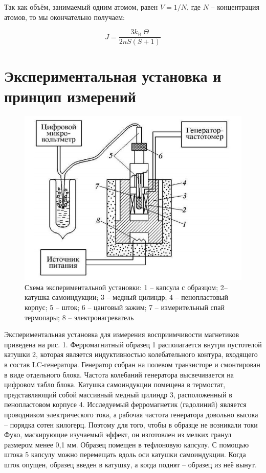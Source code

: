 \documentclass[a4paper, 12pt]{article}%
\begin{document}
Так как объём, занимаемый одним атомом, равен $V=1/N$, где $N$ -- концентрация атомов, то мы окончательно получаем:

$$
J=\frac{3 k_{\text {B }} \Theta}{2 n S(S+1)}
$$
\newpage
\section{Экспериментальная установка и принцип измерений}

\begin{figure}[h!]
\begin{center}
\includegraphics[scale=0.7]{1.jpg}
\caption{Схема экспериментальной установки: 1 -- капсула с образцом; 2-- катушка самоиндукции; 3 -- медный цилиндр; 4 -- пенопластовый корпус; 5 -- шток; 6 -- цанговый зажим; 7 -- измерительный спай термопары; 8 -- электронагреватель}
\end{center}
\end{figure}

Экспериментальная установка для измерения восприимчивости магнетиков приведена на рис. 1.  Ферромагнитный образец 1 располагается внутри пустотелой катушки 2, которая является индуктивностью колебательного контура, входящего в состав LC-генератора. Генератор собран на полевом транзисторе и смонтирован в виде отдельного блока. Частота колебаний генератора высвечивается на цифровом табло блока. Катушка самоиндукции помещена в термостат, представляющий собой массивный медный цилиндр 3, расположенный в пенопластовом корпусе 4. Исследуемый ферромагнетик (гадолиний) является проводником электрического тока, а рабочая частота генератора довольно высока -- порядка сотен килогерц. Поэтому для того, чтобы в образце не возникали токи Фуко, маскирующие изучаемый эффект, он изготовлен из мелких гранул размером менее 0,1 мм. Образец помещен в тефлоновую капсулу. С помощью штока 5 капсулу можно перемещать вдоль оси катушки самоиндукции. Когда шток опущен, образец введен в катушку, а когда поднят -- образец из неё вынут.
\end{document}
